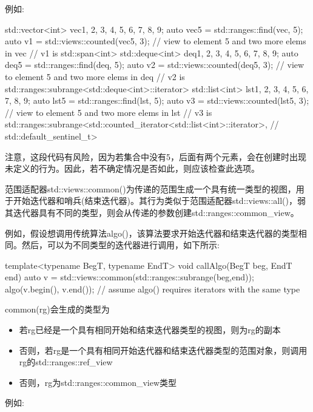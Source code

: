 例如:

\begin{cpp}
std::vector<int> vec{1, 2, 3, 4, 5, 6, 7, 8, 9};
auto vec5 = std::ranges::find(vec, 5);
auto v1 = std::views::counted(vec5, 3); // view to element 5 and two more elems in vec
	// v1 is std::span<int>
std::deque<int> deq{1, 2, 3, 4, 5, 6, 7, 8, 9};
auto deq5 = std::ranges::find(deq, 5);
auto v2 = std::views::counted(deq5, 3); // view to element 5 and two more elems in deq
	// v2 is std::ranges::subrange<std::deque<int>::iterator>
std::list<int> lst{1, 2, 3, 4, 5, 6, 7, 8, 9};
auto lst5 = std::ranges::find(lst, 5);
auto v3 = std::views::counted(lst5, 3); // view to element 5 and two more elems in lst
	// v3 is std::ranges::subrange<std::counted_iterator<std::list<int>::iterator>,
	// std::default_sentinel_t>
\end{cpp}

注意，这段代码有风险，因为若集合中没有5，后面有两个元素，会在创建时出现未定义的行为。因此，若不确定情况是否如此，则应该检查此选项。


范围适配器std::views::common()为传递的范围生成一个具有统一类型的视图，用于开始迭代器和哨兵(结束迭代器)。其行为类似于范围适配器std::views::all()，弱其迭代器具有不同的类型，则会从传递的参数创建std::ranges::common\_view。

例如，假设想调用传统算法algo()，该算法要求开始迭代器和结束迭代器的类型相同。然后，可以为不同类型的迭代器进行调用，如下所示:

\begin{cpp}
template<typename BegT, typename EndT>
void callAlgo(BegT beg, EndT end)
{
	auto v = std::views::common(std::ranges::subrange(beg,end));
	algo(v.begin(), v.end()); // assume algo() requires iterators with the same type
}
\end{cpp}

common(rg)会生成的类型为

\begin{itemize}
\item
若rg已经是一个具有相同开始和结束迭代器类型的视图，则为rg的副本

\item
否则，若rg是一个具有相同开始迭代器和结束迭代器类型的范围对象，则调用rg的std::ranges::ref\_view

\item
否则，rg为std::ranges::common\_view类型
\end{itemize}

例如:

